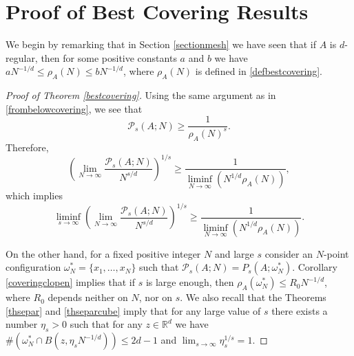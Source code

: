 \documentclass[12pt]{amsart}
\theoremstyle{definition}
\def\R{\mathbb{R}}
\newcommand{\1}{\mathbf{1}}
\newcommand{\PP}{\mathcal{P}}
\begin{document}
\section{Proof of Best Covering Results}\label{sectionlimit}

We begin by remarking that in Section \ref{sectionmesh} we have seen that if $A$ is $d$-regular, then for some positive constants $a$ and $b$ we have $aN^{-1/d}\leqslant \rho_A(N) \leqslant bN^{-1/d}$, where $\rho_A(N)$ is defined in \eqref{defbestcovering}.

\begin{proof}[Proof of Theorem \ref{bestcovering}]
Using the same argument as in \eqref{frombelowcovering}, we see that
$$
\PP_s(A; N)\geqslant \frac{1}{\rho_A(N)^{s}}.
$$
Therefore,
$$
\left(\lim_{N\to \infty} \frac{\PP_s(A; N)}{N^{s/d}}\right)^{1/s}\geqslant \frac{1}{\liminf_{N\to \infty}(N^{1/d}\rho_A(N))},
$$
which implies
\begin{equation}\label{liminfliminf}
\liminf_{s\to\infty}\left(\lim_{N\to \infty} \frac{\PP_s(A; N)}{N^{s/d}}\right)^{1/s}\geqslant \frac{1}{\liminf_{N\to \infty}(N^{1/d}\rho_A(N))}.
\end{equation}

On the other hand, for a fixed positive integer $N$ and large $s$ consider an $N$-point configuration $\omega^*_N=\{x_1, \ldots, x_N\}$ such that $
\PP_s(A; N)=P_s(A; \omega^*_N)$. Corollary \ref{coveringclopen} implies that if $s$ is large enough, then $\rho_A(\omega^*_N)\leqslant R_0 N^{-1/d}$, where $R_0$ depends neither on $N$, nor on $s$. We also recall that the Theorems \ref{thsepar} and \ref{thseparcube} imply that for any large value of $s$ there exists a number $\eta_s>0$ such that for any $z\in \R^d$ we have $\#(\omega^*_N\cap B(z, \eta_s N^{-1/d}))\leqslant 2d-1$ and $\lim_{s\to \infty}\eta_s^{1/s}=1$.  


\end{proof}
\end{document}
